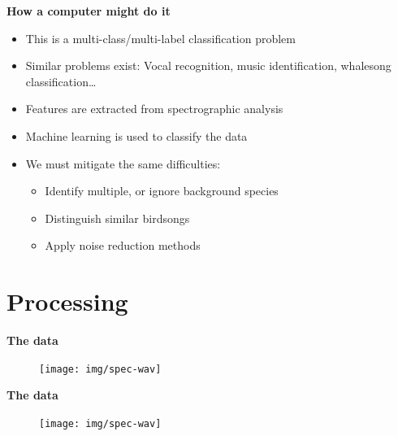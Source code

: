 \documentclass[t, xcolor={dvipsnames}]{beamer}
\begin{document}
\begin{frame}[fragile]
  \vspace{0.5cm}
  {\bfseries\Large How a computer might do it}\\
  \vspace{0.5cm}
  \begin{addmargin}{0.5cm}
    \begin{itemize}
      \item This is a multi-class/multi-label classification problem
      \item Similar problems exist: Vocal recognition, music identification, whalesong classification\ldots
      \item Features are extracted from spectrographic analysis
      \item Machine learning is used to classify the data
      \item We must mitigate the same difficulties:
      \begin{itemize}
        \item Identify multiple, or ignore background species
        \item Distinguish similar birdsongs
        \item Apply noise reduction methods
      \end{itemize}
    \end{itemize}
  \end{addmargin}
\end{frame}


\section{Processing}

\begin{frame}[fragile]
  \vspace{0.5cm}
  {\bfseries\Large The data}
  \vspace{-0.15cm}
  \begin{figure}
    \texttt{[image: img/spec-wav]}
  \end{figure}
\end{frame}

\begin{frame}[fragile]
  \vspace{0.5cm}
  {\bfseries\Large The data}
  \begin{figure}
    \texttt{[image: img/spec-wav]}
  \end{figure}
\end{frame}
\end{document}
